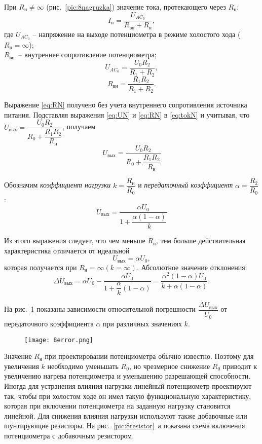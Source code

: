 При $ R_\text{н} \neq \infty $ (рис.~\ref{pic:8nagruzka}) значение тока, протекающего через $ R_\text{н} $:
\begin{equation}
\label{eq:tokN}
I_\text{н} = \dfrac{U_{{AC}_0}}{R_\text{вн} + R_\text{н}},
\end{equation}
где $ U_{{AC}_0} $ -- напряжение на выходе потенциометра в режиме холостого хода ($ R_\text{н} = \infty $); \\$ R_\text{вн} $~-- внутреннее сопротивление потенциометра;
\begin{equation}
\label{eq:UN}
 U_{{AC}_0} = \dfrac{U_0 R_2}{R_1 + R_2},
\end{equation}
\begin{equation}
\label{eq:RN}
R_\text{вн} = \dfrac{R_1 R_2}{R_1 + R_2}.
\end{equation}

Выражение \eqref{eq:RN} получено без учета внутреннего сопротивления источника питания. Подставляя выражения \eqref{eq:UN} и \eqref{eq:RN} в \eqref{eq:tokN} и учитывая, что  $ U_\text{вых} = \dfrac{U_0 R_2}{R_0 + \dfrac{R_1 R_2}{R_\text{н}}} $, получаем
\[ U_\text{вых} = \dfrac{U_0 R_2}{R_0 + \dfrac{R_1 R_2}{R_\text{н}}} \]

Обозначим \textit{коэффициент нагрузки} $ k = \dfrac{R_\text{н}}{R_0} $ и \textit{передаточный коэффициент} $ \alpha = \dfrac{R_2}{R_0} $:
\[ U_\text{вых} = \dfrac{\alpha U_0}{1+\dfrac{\alpha (1-\alpha)}{k}} \]

Из этого выражения следует, что чем меньше $ R_\text{н} $, тем больше действительная характеристика отличается от идеальной 
\[U_\text{вых} = \alpha U_0,\]
которая получается при $ R_\text{н} = \infty (k = \infty) $. Абсолютное значение отклонения:
\[ \Delta U_\text{вых} = \alpha U_0 - \dfrac{\alpha U_0}{1 + \dfrac{\alpha}{k}(1-\alpha)} = \dfrac{\alpha^2 (1-\alpha) U_0}{k+\alpha(1-\alpha)}.\]

На рис.~\ref{pic:8error} показаны зависимости относительной погрешности $ \dfrac{\Delta U_\text{вых}}{U_0} $ от передаточного коэффициента $ \alpha $ при различных значениях $ k $.

\begin{figure}[h!]
	\caption{  }
	\texttt{[image: 8error.png]}
	\label{pic:8error}
\end{figure}

Значение $ R_\text{н} $ при проектировании потенциометра обычно известно. Поэтому для увеличения $ k $ необходимо уменьшать $ R_0 $, но чрезмерное снижение $ R_0 $ приводит к увеличению нагрева потенциометра и уменьшению разрешающей способности. Иногда для устранения влияния нагрузки линейный потенциометр проектируют так, чтобы при холостом ходе он имел такую функциональную характеристику, которая при включении потенциометра на заданную нагрузку становится линейной. Для снижения влияния нагрузки используют также добавочные или шунтирующие резисторы. На рис.~\ref{pic:8resistor}~а показана схема включения потенциометра с добавочным резистором.

